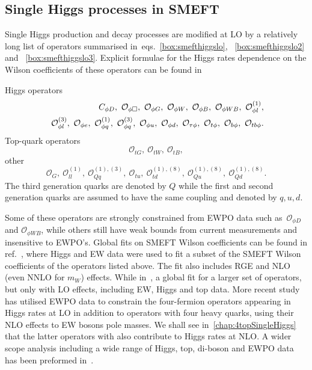 \subsection{Single Higgs processes in SMEFT}
Single Higgs production and decay processes are modified at LO by a relatively long list of operators summarised in~eqs.~\eqref{box:smefthiggslo}, ~\eqref{box:smefthiggslo2} and ~\eqref{box:smefthiggslo3}. Explicit formulae for the Higgs rates dependence on the Wilson coefficients of these operators can be found in~\cite{ATLAS:2019dhi}
\begin{tcolorbox}[title=SMEFT operators modifying Higgs rates at LO,
	title filled=false,
	colback=Mahogany!5!white,
	colframe=Mahogany ]
Higgs operators
	\begin{align}
C_{\phi D}, \ \mathcal{O}_{\phi \Box},\ \mathcal{O}_{\phi G}, \ \mathcal{O}_{\phi W},\ \mathcal{O}_{\phi B}, \ \mathcal{O}_{\phi W B},\ \mathcal{O}_{\phi l}^{(1)}, \nn \\
 \ \mathcal{O}_{\phi l}^{(3)}, \ \mathcal{O}_{\phi e},\ \mathcal{O}_{\phi q}^{(1)},\ \mathcal{O}_{\phi q}^{(3)}, \  \mathcal{O}_{\phi u}, \ \mathcal{O}_{\phi d},\ \mathcal{O}_{\tau \phi}, \ \mathcal{O}_{t \phi}, \ \mathcal{O}_{b \phi},\ \mathcal{O}_{tb \phi}.
 	\label{box:smefthiggslo}
	\end{align}
Top-quark operators
	\begin{equation}
 \mathcal{O}_{t G}, \ \mathcal{O}_{t W}, \ \mathcal{O}_{t B},
 	\label{box:smefthiggslo2}
\end{equation}
other 
	\begin{equation}
	\mathcal{O}_G,\ \mathcal{O}_{ll}^{(1)},\ \mathcal{O}_{Qq}^{(1),(3)},\ \mathcal{O}_{tu},\ \mathcal{O}_{td}^{(1),(8)},\ \mathcal{O}_{Qu}^{(1),(8)}, \ \mathcal{O}_{Qd}^{(1),(8)}.
		\label{box:smefthiggslo3}
\end{equation}
The third generation quarks are denoted by $Q$ while the first and second generation quarks are assumed to have the same coupling and denoted by $q,u,d$.
\end{tcolorbox}
Some of these operators are strongly constrained from EWPO data such as~$\mathcal{O}_{\phi D}$ and $ \mathcal{O}_{\phi W B}$, while others still have weak bounds from current measurements and insensitive to EWPO's. Global fits on SMEFT Wilson coefficients can be found in ref.~\cite{Dawson:2020oco}, where Higgs and EW data were used to fit a subset of the SMEFT Wilson coefficients of the operators listed above. The fit also includes RGE and NLO (even NNLO for $m_W$) effects. While in~\cite{Ethier:2021bye}, a global fit for a larger set of operators, but only with LO effects, including EW, Higgs and top data.  More recent study~\cite{Dawson:2022bxd} has utilised EWPO data to constrain the four-fermion operators appearing in Higgs rates at LO in addition to operators with four heavy quarks, using their NLO effects to EW bosons pole masses. We shall see in~\autoref{chap:4topSingleHiggs} that the latter operators with also contribute to Higgs rates at NLO. A wider scope analysis including a wide range of Higgs, top, di-boson and EWPO data has been preformed in~\cite{Ellis:2020unq}. \\
